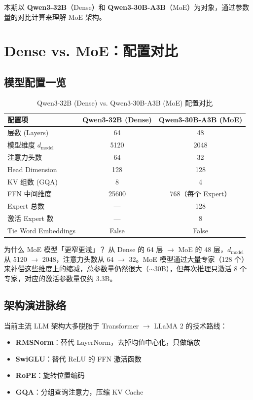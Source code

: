 \documentclass[a4paper]{article}
\begin{document}
本期以 \textbf{Qwen3-32B}（Dense）和 \textbf{Qwen3-30B-A3B}（MoE）为对象，通过参数量的对比计算来理解 MoE 架构。

\section{Dense vs. MoE：配置对比}

\subsection{模型配置一览}

\begin{table}[H]
\centering
\caption{Qwen3-32B (Dense) vs. Qwen3-30B-A3B (MoE) 配置对比}
\begin{tabular}{lcc}
\toprule
\textbf{配置项} & \textbf{Qwen3-32B (Dense)} & \textbf{Qwen3-30B-A3B (MoE)} \\
\midrule
层数 (Layers) & 64 & 48 \\
模型维度 $d_{\text{model}}$ & 5120 & 2048 \\
注意力头数 & 64 & 32 \\
Head Dimension & 128 & 128 \\
KV 组数 (GQA) & 8 & 4 \\
FFN 中间维度 & 25600 & 768（每个 Expert） \\
Expert 总数 & — & 128 \\
激活 Expert 数 & — & 8 \\
Tie Word Embeddings & False & False \\
\bottomrule
\end{tabular}
\end{table}

\begin{knowledgebox}{为什么 MoE 模型「更窄更浅」？}
从 Dense 的 64 层 $\to$ MoE 的 48 层，$d_{\text{model}}$ 从 5120 $\to$ 2048，注意力头数从 64 $\to$ 32。MoE 模型通过大量专家（128 个）来补偿这些维度上的缩减，总参数量仍然很大（$\sim$30B），但每次推理只激活 8 个专家，对应的激活参数量仅约 3.3B。
\end{knowledgebox}

\subsection{架构演进脉络}

当前主流 LLM 架构大多脱胎于 Transformer $\to$ LLaMA 2 的技术路线：

\begin{itemize}
  \item \textbf{RMSNorm}：替代 LayerNorm，去掉均值中心化，只做缩放
  \item \textbf{SwiGLU}：替代 ReLU 的 FFN 激活函数
  \item \textbf{RoPE}：旋转位置编码
  \item \textbf{GQA}：分组查询注意力，压缩 KV Cache
\end{itemize}
\end{document}
